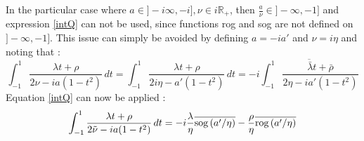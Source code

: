 \begin{note}
\label{intQ_postcritical}
In the particular case where $a \in \rbrack -i\infty,-i\rbrack, \nu \in i\mathbb{R}_+$, then $\frac{a}{\nu} \in \rbrack -\infty,-1\rbrack$ and expression \eqref{intQ} can not be used, since functions rog and sog are not defined on $\rbrack -\infty,-1\rbrack$. This issue can simply be avoided by defining $a=-ia'$ and $\nu=i\eta$ and noting that :
\begin{equation}
    \int_{-1}^{1} \frac{\lambda t +\rho}{2\nu-ia(1-t^2)}\, dt=\int_{-1}^{1} \frac{\lambda t +\rho}{2i\eta-a'(1-t^2)}\, dt=-i\overline{\int_{-1}^{1} \frac{\bar{\lambda} t +\bar{\rho}}{2\eta-ia'(1-t^2)}}
\end{equation}
Equation \eqref{intQ} can now be applied :
\begin{equation}
    \int_{-1}^{1} \frac{\lambda t +\rho}{2\tilde{\nu}-ia(1-t^2)}\, dt=-i\frac{\lambda}{\eta}\overline{\mbox{sog}\left(a'/\eta\right)}-\frac{\rho}{\eta}\overline{\mbox{rog}\left(a'/\eta\right)}
\label{exprQ_postcr}
\end{equation}
\end{note}



